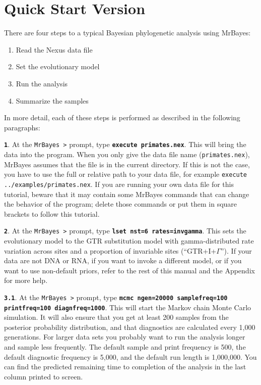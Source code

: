 \documentclass[12pt]{book}
\newcommand{\ttt}[1]{\texttt{#1}}
\newcommand{\tb}[1]{\ttt{\textbf{#1}}}
\begin{document}
\section{Quick Start Version}
There are four steps to a typical Bayesian phylogenetic analysis using MrBayes:
\begin{enumerate}
\item Read the Nexus data file
\item Set the evolutionary model
\item Run the analysis
\item Summarize the samples
\end{enumerate}

In more detail, each of these steps is performed as described in the following paragraphs:

\tb{1}. At the \ttt{MrBayes >} prompt, type \tb{execute primates.nex}. This will bring the data
into the program. When you only give the data file name (\ttt{primates.nex}), MrBayes assumes that
the file is in the current directory. If this is not the case, you have to use the full or relative
path to your data file, for example \ttt{execute ../examples/primates.nex}. If you are running your
own data file for this tutorial, beware that it may contain some MrBayes commands that can change
the behavior of the program; delete those commands or put them in square brackets to follow this
tutorial.

\tb{2}. At the \ttt{MrBayes >} prompt, type \tb{lset nst=6 rates=invgamma}. This sets the
evolutionary model to the GTR substitution model with gamma-distributed rate variation across sites
and a proportion of invariable sites (``GTR+I+$\Gamma$''). If your data are not DNA or RNA, if you
want to invoke a different model, or if you want to use non-default priors, refer to the rest of
this manual and the Appendix for more help.

\tb{3.1}. At the \ttt{MrBayes >} prompt, type \tb{mcmc ngen=20000 samplefreq=100 printfreq=100
diagnfreq=1000}. This will start the Markov chain Monte Carlo simulation. It will also ensure that
you get at least 200 samples from the posterior probability distribution, and that diagnostics are
calculated every 1,000 generations. For larger data sets you probably want to run the analysis
longer and sample less frequently. The default sample and print frequency is 500, the default
diagnostic frequency is 5,000, and the default run length is 1,000,000. You can find the predicted
remaining time to completion of the analysis in the last column printed to screen.
\end{document}

